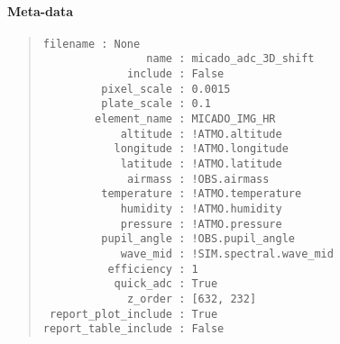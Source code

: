 \paragraph{Meta-data%
  \label{id2}%
}

\begin{quote}
\begin{alltt}
\begin{lstlisting}[frame=single]
            filename : None
                name : micado_adc_3D_shift
             include : False
         pixel_scale : 0.0015
         plate_scale : 0.1
        element_name : MICADO_IMG_HR
            altitude : !ATMO.altitude
           longitude : !ATMO.longitude
            latitude : !ATMO.latitude
             airmass : !OBS.airmass
         temperature : !ATMO.temperature
            humidity : !ATMO.humidity
            pressure : !ATMO.pressure
         pupil_angle : !OBS.pupil_angle
            wave_mid : !SIM.spectral.wave_mid
          efficiency : 1
           quick_adc : True
             z_order : [632, 232]
 report_plot_include : True
report_table_include : False
\end{lstlisting}
\end{alltt}
\end{quote}
